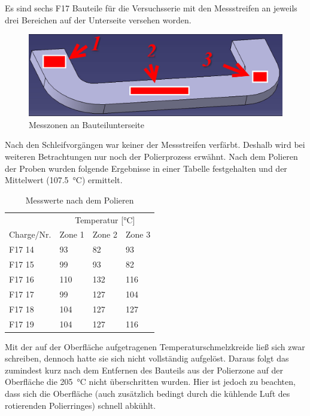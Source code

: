 \documentclass[12pt,a4paper,parskip]{scrartcl}
\begin{document}
Es sind sechs F17 Bauteile für die Versuchsserie mit den Messstreifen an jeweils drei Bereichen auf der Unterseite versehen worden.
\begin{figure}[H]
\centering
\includegraphics[width=.8\textwidth]{messbereicheVDKDunterseite}
\caption{Messzonen an Bauteilunterseite}
\label{messzonen}
\end{figure}

Nach den Schleifvorgängen war keiner der Messstreifen verfärbt. Deshalb wird bei weiteren Betrachtungen nur noch der Polierprozess erwähnt. Nach dem Polieren der Proben wurden folgende Ergebnisse in einer Tabelle festgehalten und der Mittelwert (\SI{107.5}{\degreeCelsius}) ermittelt.



\begin{table}[H]
\caption{Messwerte nach dem Polieren}
\label{tab:messwerte}
\centering
\begin{tabular}{llll}
\toprule
              & \multicolumn{3}{c}{Temperatur [\si{\degreeCelsius}]}\\
              \cmidrule(ll){2-4}
 Charge/Nr. & Zone 1 & Zone 2 & Zone 3 \\
 \midrule
 F17 14 & 93 & 82 & 93 \\
 F17 15 & 99 & 93 & 82 \\
 F17 16 & 110 & 132 & 116 \\
 F17 17 & 99 & 127 & 104 \\
 F17 18 & 104 & 127 & 127 \\
 F17 19 & 104 & 127 & 116 \\
 \bottomrule             
\end{tabular}
\end{table}

Mit der auf der Oberfläche aufgetragenen Temperaturschmelzkreide ließ sich zwar schreiben, dennoch hatte sie sich nicht vollständig aufgelöst. Daraus folgt das zumindest kurz nach dem Entfernen des Bauteils aus der Polierzone auf der Oberfläche die \SI{205}{\degreeCelsius} nicht überschritten wurden. Hier ist jedoch zu beachten,  dass sich die Oberfläche (auch zusätzlich bedingt durch die kühlende Luft des rotierenden Polierringes) schnell abkühlt.
\end{document}
